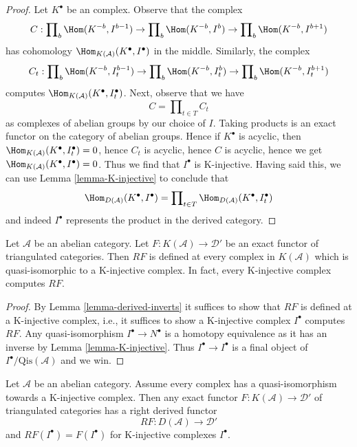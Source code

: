 \begin{proof}
Let $K^\bullet$ be an complex. Observe that the complex
$$
C :
\prod\nolimits_b \Hom(K^{-b}, I^{b - 1}) \to
\prod\nolimits_b \Hom(K^{-b}, I^b) \to
\prod\nolimits_b \Hom(K^{-b}, I^{b + 1})
$$
has cohomology $\Hom_{K(\mathcal{A})}(K^\bullet, I^\bullet)$
in the middle. Similarly, the complex
$$
C_t :
\prod\nolimits_b \Hom(K^{-b}, I_t^{b - 1}) \to
\prod\nolimits_b \Hom(K^{-b}, I_t^b) \to
\prod\nolimits_b \Hom(K^{-b}, I_t^{b + 1})
$$
computes $\Hom_{K(\mathcal{A})}(K^\bullet, I_t^\bullet)$.
Next, observe that we have
$$
C = \prod\nolimits_{t \in T} C_t
$$
as complexes of abelian groups by our choice of $I$.
Taking products is an exact functor on the
category of abelian groups. Hence if $K^\bullet$ is acyclic, then
$\Hom_{K(\mathcal{A})}(K^\bullet, I_t^\bullet) = 0$, hence
$C_t$ is acyclic, hence $C$ is acyclic, hence we get
$\Hom_{K(\mathcal{A})}(K^\bullet, I^\bullet) = 0$.
Thus we find that $I^\bullet$ is K-injective.
Having said this, we can use Lemma \ref{lemma-K-injective}
to conclude that
$$
\Hom_{D(\mathcal{A})}(K^\bullet, I^\bullet)
=
\prod\nolimits_{t \in T} \Hom_{D(\mathcal{A})}(K^\bullet, I_t^\bullet)
$$
and indeed $I^\bullet$ represents the product in the derived category.
\end{proof}

\begin{lemma}
\label{lemma-K-injective-defined}
Let $\mathcal{A}$ be an abelian category.
Let $F : K(\mathcal{A}) \to \mathcal{D}'$ be an exact functor
of triangulated categories. Then $RF$ is defined at every complex
in $K(\mathcal{A})$ which is quasi-isomorphic to a
K-injective complex. In fact, every K-injective complex computes $RF$.
\end{lemma}

\begin{proof}
By
Lemma \ref{lemma-derived-inverts}
it suffices to show that $RF$ is defined at a K-injective complex,
i.e., it suffices to show a K-injective complex $I^\bullet$ computes $RF$.
Any quasi-isomorphism $I^\bullet \to N^\bullet$ is a homotopy equivalence
as it has an inverse by
Lemma \ref{lemma-K-injective}.
Thus $I^\bullet \to I^\bullet$ is a final object of
$I^\bullet/\text{Qis}(\mathcal{A})$ and we win.
\end{proof}

\begin{lemma}
\label{lemma-enough-K-injectives-implies}
Let $\mathcal{A}$ be an abelian category.
Assume every complex has a quasi-isomorphism towards a K-injective complex.
Then any exact functor $F : K(\mathcal{A}) \to \mathcal{D}'$ of triangulated
categories has a right derived functor
$$
RF : D(\mathcal{A}) \longrightarrow \mathcal{D}'
$$
and $RF(I^\bullet) = F(I^\bullet)$ for K-injective complexes $I^\bullet$.
\end{lemma}

